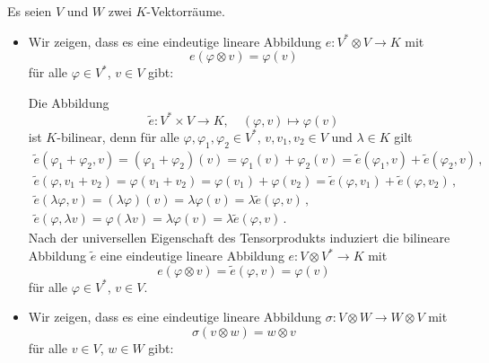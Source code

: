 \begin{example}
  Es seien $V$ und $W$ zwei $K$-Vektorräume.
  \begin{itemize}
    \item
      Wir zeigen, dass es eine eindeutige lineare Abbildung $e \colon V^* \otimes V \to K$ mit
      \[
          e(\varphi \otimes v)
        = \varphi(v)
      \]
      für alle $\varphi \in V^*$, $v \in V$ gibt:
      
      Die Abbildung
      \[
                \tilde{e}
        \colon  V^* \times V
        \to     K,
        \quad   (\varphi, v)
        \mapsto \varphi(v)
      \]
      ist $K$-bilinear, denn für alle $\varphi, \varphi_1, \varphi_2 \in V^*$, $v, v_1, v_2 \in V$ und $\lambda \in K$ gilt
      \begin{gather*}
                \tilde{e}(\varphi_1 + \varphi_2, v)
        = (\varphi_1 + \varphi_2)(v)
        = \varphi_1(v) + \varphi_2(v)
        = \tilde{e}(\varphi_1, v) + \tilde{e}(\varphi_2, v) \,,
        \\
          \tilde{e}(\varphi, v_1 + v_2)
        = \varphi(v_1 + v_2)
        = \varphi(v_1) + \varphi(v_2)
        = \tilde{e}(\varphi, v_1) + \tilde{e}(\varphi, v_2) \,,
        \\
          \tilde{e}(\lambda \varphi, v)
        = (\lambda \varphi)(v)
        = \lambda \varphi(v)
        = \lambda \tilde{e}(\varphi, v) \,,
        \\
          \tilde{e}(\varphi, \lambda v)
        = \varphi(\lambda v)
        = \lambda \varphi(v)
        = \lambda \tilde{e}(\varphi, v) \,.
      \end{gather*}
      Nach der universellen Eigenschaft des Tensorprodukts induziert die bilineare Abbildung $\tilde{e}$ eine eindeutige lineare Abbildung $e \colon V \otimes V^* \to K$ mit
      \[
          e(\varphi \otimes v)
        = \tilde{e}(\varphi, v)
        = \varphi(v)
      \]
      für alle $\varphi \in V^*$, $v \in V$.
    \item
      Wir zeigen, dass es eine eindeutige lineare Abbildung $\sigma \colon V \otimes W \to W \otimes V$ mit
      \[
          \sigma(v \otimes w)
        = w \otimes v
      \]
      für alle $v \in V$, $w \in W$ gibt:
      

\end{itemize}
\end{example}
